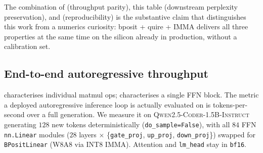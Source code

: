 \documentclass[11pt,a4paper]{article}
\begin{document}
\begin{table}[h]
\centering
{}
\caption{WikiText-2-raw test perplexity, baseline \texttt{bf16}
vs.\ FFN-only bposit-W8A8 via INT8 IMMA. Across three configurations
the perplexity gap is below $1\,\%$ --- squarely within the
\emph{acceptable W8A8} band reported for SmoothQuant
\cite{smoothquant} and AWQ \cite{awq} on the same model class. No
calibration set was used (per-token activation $\times$ per-channel
weight scaling, computed on the fly). Reproducible via
\texttt{packages/mosyne\_bposit/examples/wikitext\_ppl\_bench.py}.}
\label{tab:wikitext_ppl}
\end{table}

The combination of  (throughput parity), this table
(downstream perplexity preservation), and 
(reproducibility) is the substantive claim that distinguishes this
work from a numerics curiosity: bposit + quire + IMMA delivers all
three properties at the same time on the silicon already in
production, without a calibration set.

\subsection{End-to-end autoregressive throughput}
\label{sec:e2e}

 characterises individual matmul ops; 
characterises a single FFN block. The metric a deployed autoregressive
inference loop is actually evaluated on is tokens-per-second over a full
generation. We measure it on \textsc{Qwen2.5-Coder-1.5B-Instruct}
generating $128$ new tokens deterministically (\texttt{do\_sample=False}),
with all $84$ FFN \texttt{nn.Linear} modules ($28$ layers
$\times$ \{\texttt{gate\_proj}, \texttt{up\_proj}, \texttt{down\_proj}\})
swapped for \texttt{BPositLinear} (W8A8 via INT8 IMMA). Attention and
\texttt{lm\_head} stay in \texttt{bf16}.
\end{document}
